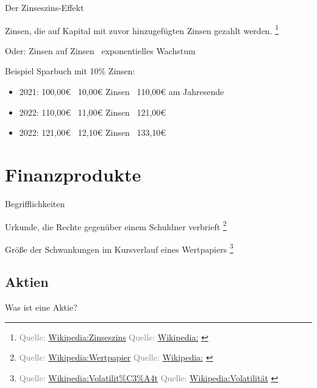 \documentclass{beamer}
\let\oldfootnote\footnote
\renewcommand{\footnote}[1]
{%
	\oldfootnote
	{
		\tiny
		\textcolor{gray}{#1}
	}%
}
\newcommand{\citewiki}[2][]
{%
	\footnote
	{
		\ifthenelse{\isempty{#1}}
		{
			Quelle: \href{https://de.wikipedia.org/wiki/#2}{Wikipedia:#2}
		}
		{
			Quelle: \href{https://de.wikipedia.org/wiki/#2}{Wikipedia:#1}
		}
	}
}
\begin{document}
			\begin{frame}{Der Zinseszins-Effekt}
				\begin{definition}
					Zinsen, die auf Kapital mit zuvor hinzugefügten Zinsen gezahlt werden.\citewiki{Zinseszins}
				\end{definition}
				
				Oder: Zinsen auf Zinsen \textrightarrow\ exponentielles Wachstum\\\hfill
				
				Beispiel Sparbuch mit 10\% Zinsen:
				\begin{itemize}
					\item 2021: 100,00€ \textrightarrow\ 10,00€ Zinsen \textrightarrow\ 110,00€ am Jahresende
					\item 2022: 110,00€ \textrightarrow\ 11,00€ Zinsen \textrightarrow\ 121,00€
					\item 2022: 121,00€ \textrightarrow\ 12,10€ Zinsen \textrightarrow\ 133,10€
				\end{itemize}
			\end{frame}
	
	\section{Finanzprodukte}
	
		\begin{frame}
		\end{frame}
	
		\begin{frame}{Begrifflichkeiten}
			\begin{description}[labelwidth=0cm]
				\item[Wertpapier] Urkunde, die Rechte gegenüber einem Schuldner verbrieft\citewiki{Wertpapier}
				\item[Volatilität] Größe der Schwankungen im Kursverlauf eines Wertpapiers\citewiki[Volatilität]{Volatilit\%C3\%A4t}
			\end{description}
		\end{frame}
	
		\subsection{Aktien}
		
			\begin{frame}
				\vspace{0.5cm}
				\begin{center}
					Was ist eine Aktie?
				\end{center}
			\end{frame}
			
\end{document}
